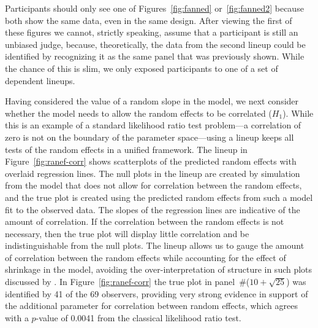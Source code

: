 \documentclass[12pt]{article}
\newcommand{\alnote}[1]{\todo[inline,color=green!40]{#1}} %
\newcommand{\hhnote}[1]{\todo[inline,color=orange!40]{#1}}
\begin{document}

Participants should only see one of Figures~\ref{fig:fanned} or~\ref{fig:fanned2} because both show the same data, even in the same design. After viewing the first of these figures we cannot, strictly speaking, assume that a participant is still an unbiased judge, because, theoretically, the data from the  second lineup could be identified by recognizing it as the same panel that was previously shown. While the chance of this is slim, we only exposed participants to one of a set of dependent lineups.

Having considered the value of a random slope in the model, we next consider whether the model needs to allow the random effects to be correlated ($H_1$). While this is an example of a standard likelihood ratio test problem---a correlation of zero is not on the boundary of the parameter space---using a lineup keeps all tests of the random effects in a unified framework. The lineup in Figure~\ref{fig:ranef-corr} shows scatterplots of the predicted random effects with overlaid regression lines. 
 The null plots in the lineup are created by simulation from the model that does not allow for correlation between the random effects, and the true plot is created using the predicted random effects from such a model fit to the observed data.
The slopes of the regression lines are indicative of the amount of correlation. 
 If the correlation between the random effects is not necessary, then the true plot will display little correlation and be indistinguishable from the null plots.
The lineup allows us to gauge the amount of correlation between the random effects while accounting for the effect of shrinkage in the model, avoiding the over-interpretation of structure in such plots discussed by \cite{Morrell:2000ve}.
  In Figure~\ref{fig:ranef-corr} the true plot in panel~\#($10 + \sqrt{25}$) was identified by 41 of the 69 observers, providing very strong evidence in  support of  the additional parameter for correlation between random effects, which agrees with a $p$-value of 0.0041 from the classical likelihood ratio test.
\end{document}

